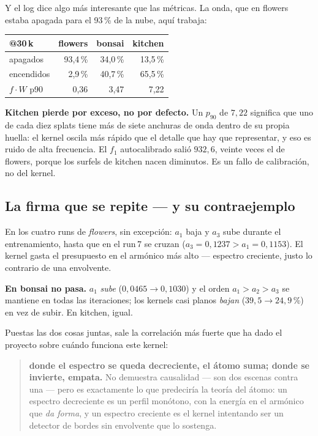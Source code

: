 \documentclass[12pt]{extarticle}
\begin{document}
Y el log dice algo más interesante que las métricas. La onda, que en flowers
estaba apagada para el 93\,\% de la nube, aquí trabaja:

\begin{center}\small
\begin{tabular}{@{}lrrr@{}}
\toprule
@30\,k & flowers & bonsai & kitchen \\
\midrule
apagados          & 93,4\,\% & 34,0\,\% & 13,5\,\% \\
encendidos        & 2,9\,\%  & 40,7\,\% & 65,5\,\% \\
$f\!\cdot\!W$ p90 & 0,36     & 3,47     & 7,22 \\
\bottomrule
\end{tabular}
\end{center}

\textbf{Kitchen pierde por exceso, no por defecto.} Un $p_{90}$ de $7{,}22$
significa que uno de cada diez splats tiene más de siete anchuras de onda dentro
de su propia huella: el kernel oscila más rápido que el detalle que hay que
representar, y eso es ruido de alta frecuencia. El $f_1$ autocalibrado salió
$932{,}6$, veinte veces el de flowers, porque los surfels de kitchen nacen
diminutos. Es un fallo de calibración, no del kernel.

\subsection{La firma que se repite --- y su contraejemplo}

En los cuatro runs de \emph{flowers}, sin excepción: $a_1$ baja y $a_3$ sube
durante el entrenamiento, hasta que en el run\,7 se cruzan
($a_3=0{,}1237 > a_1=0{,}1153$). El kernel gasta el presupuesto en el armónico
más alto --- espectro creciente, justo lo contrario de una envolvente.

\textbf{En bonsai no pasa.} $a_1$ \emph{sube} ($0{,}0465 \to 0{,}1030$) y el
orden $a_1>a_2>a_3$ se mantiene en todas las iteraciones; los kernels casi
planos \emph{bajan} ($39{,}5 \to 24{,}9$\,\%) en vez de subir. En kitchen, igual.

Puestas las dos cosas juntas, sale la correlación más fuerte que ha dado el
proyecto sobre cuándo funciona este kernel:

\begin{quote}
\textbf{donde el espectro se queda decreciente, el átomo suma; donde se
invierte, empata.} No demuestra causalidad --- son dos escenas contra una ---
pero es exactamente lo que predeciría la teoría del átomo: un espectro
decreciente es un perfil monótono, con la energía en el armónico que \emph{da
forma}, y un espectro creciente es el kernel intentando ser un detector de
bordes sin envolvente que lo sostenga.
\end{quote}
\end{document}
